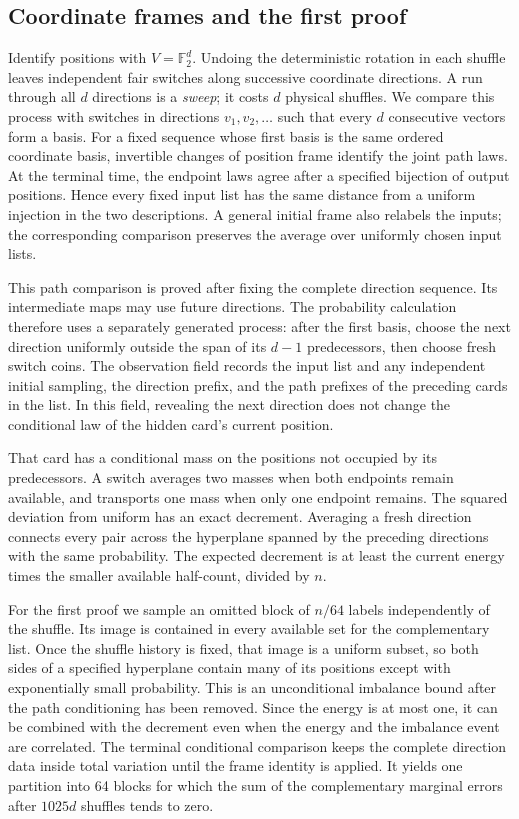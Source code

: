 \subsection{Coordinate frames and the first proof}

Identify positions with $V=\mathbb F_2^d$. Undoing the deterministic
rotation in each shuffle leaves independent fair switches along
successive coordinate directions. A run through all $d$ directions is
a \emph{sweep}; it costs $d$ physical shuffles. We compare this process
with switches in directions $v_1,v_2,\ldots$ such that every $d$
consecutive vectors form a basis. For a fixed sequence whose first
basis is the same ordered coordinate basis, invertible changes of position frame
identify the joint path laws. At the terminal time, the endpoint laws
agree after a specified bijection of output positions. Hence every fixed input
list has the same distance from a uniform injection in the two
descriptions. A general initial frame also relabels the inputs; the
corresponding comparison preserves the average over uniformly chosen
input lists.

This path comparison is proved after fixing the complete direction
sequence. Its intermediate maps may use future directions. The
probability calculation therefore uses a separately generated process:
after the first basis, choose the next direction uniformly outside the
span of its $d-1$ predecessors, then choose fresh switch coins. The
observation field records the input list and any independent initial
sampling, the direction prefix, and the path prefixes
of the preceding cards in the list. In this field, revealing the next
direction does not change the conditional law of the hidden card's
current position.

That card has a conditional mass on the positions not occupied by its
predecessors. A switch averages two masses when both endpoints remain
available, and transports one mass when only one endpoint remains.
The squared deviation from uniform has an exact decrement. Averaging
a fresh direction connects every pair across the hyperplane spanned by
the preceding directions with the same probability. The expected decrement
is at least the current energy times the smaller available half-count,
divided by $n$.

For the first proof we sample an omitted block of $n/64$ labels
independently of the shuffle. Its
image is contained in every available set for the complementary list.
Once the shuffle history is fixed, that image is a uniform subset, so
both sides of a specified hyperplane contain many of its positions
except with exponentially small probability. This is an unconditional
imbalance bound after the path conditioning has been removed. Since
the energy is at most one, it can be combined with the decrement even
when the energy and the imbalance event are correlated. The terminal
conditional comparison keeps the complete direction data inside total
variation until the frame identity is applied. It yields one partition
into 64 blocks for which the sum of the complementary marginal errors
after $1025d$ shuffles tends to zero.


